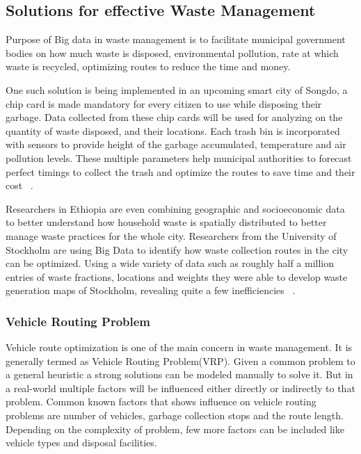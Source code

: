 \documentclass[sigconf]{acmart}
\begin{document}

\subsection{Solutions for effective Waste Management}

Purpose of Big data in waste management is to facilitate municipal government bodies on how much waste is disposed, environmental pollution, rate at which waste is recycled, optimizing routes to reduce the time and money.

One such solution is being implemented in an upcoming smart city of Songdo, a chip card is made mandatory for every citizen to use while disposing their garbage. Data collected from these chip cards will be used for analyzing on the quantity of waste disposed, and their locations. Each trash bin is incorporated with sensors to provide height of the garbage accumulated, temperature and air pollution levels. These multiple parameters help municipal authorities to forecast perfect timings to collect the trash and optimize the routes to save time and their cost ~\cite{markvan2016}.

Researchers in Ethiopia are even combining geographic and socioeconomic data to better understand how household waste is spatially distributed to better manage waste practices for the whole city. Researchers from the University of Stockholm are using Big Data to identify how waste collection routes in the city can be optimized. Using a wide variety of data such as roughly half a million entries of waste fractions, locations and weights they were able to develop waste generation maps of Stockholm, revealing quite a few inefficiencies ~\cite{markvan2016}.

\subsubsection{Vehicle Routing Problem}
Vehicle route optimization is one of the main concern in waste management. It is generally termed as Vehicle Routing Problem(VRP). Given a common problem to a general heuristic a strong solutions can be modeled manually to solve it. But in a real-world multiple factors will be influenced either directly or indirectly to that problem. Common known factors that shows influence on vehicle routing problems are number of vehicles, garbage collection stops and the route length. Depending on the complexity of problem, few more factors can be included like vehicle types and disposal facilities. 
\end{document}
